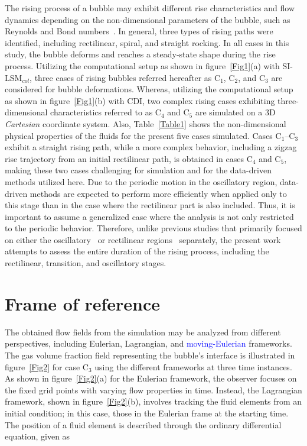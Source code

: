 \documentclass[a4paper,fleqn]{cas-sc}
\newcommand{\hl}[1]{\textcolor{blue}{#1}}
\newcommand{\hl}[1]{#1}
\begin{document}
	The rising process of a bubble may exhibit different rise characteristics and flow dynamics depending on the non-dimensional parameters of the bubble, such as Reynolds and Bond numbers~\cite{Cano-Lozano2016, Hua2007}. In general, three types of rising paths were identified, including rectilinear, spiral, and straight rocking. In all cases in this study, the bubble deforms and reaches a steady-state shape during the rise process. Utilizing the computational setup as shown in figure~\ref{Fig1}(a) with SI-LSM$_{col}$, three cases of rising bubbles referred hereafter as C$_1$, C$_2$, and C$_3$ are considered for bubble deformations. Whereas, utilizing the computational setup as shown in figure~\ref{Fig1}(b) with CDI, two complex rising cases exhibiting three-dimensional characteristics referred to as C$_4$ and C$_5$ are simulated on a 3D \textit{Cartesian} coordinate system. Also, Table~\ref{Table1} shows the non-dimensional physical properties of the fluids for the present five cases simulated. Cases C$_1$--C$_3$ exhibit a straight rising path, while a more complex behavior, including a zigzag rise trajectory from an initial rectilinear path, is obtained in cases C$_4$ and C$_5$, making these two cases challenging for simulation and for the data-driven methods utilized here. Due to the periodic motion in the oscillatory region, data-driven methods are expected to perform more efficiently when applied only to this stage than in the case where the rectilinear part is also included. Thus, it is important to assume a generalized case where the analysis is not only restricted to the periodic behavior. Therefore, unlike previous studies that primarily focused on either the oscillatory~\cite{Yin2023} or rectilinear regions~\cite{Yin2023a} separately, the present work attempts to assess the entire duration of the rising process, including the rectilinear, transition, and oscillatory stages. 
	
	\section{Frame of reference}
	\label{Framework}
	The obtained flow fields from the simulation may be analyzed from different perspectives, including Eulerian, Lagrangian, and \hl{moving-Eulerian} frameworks. The gas volume fraction field representing the bubble's interface is illustrated in figure~\ref{Fig2} for case C$_3$ using the different frameworks at three time instances. As shown in figure~\ref{Fig2}(a) for the Eulerian framework, the observer focuses on the fixed grid points with varying flow properties in time. Instead, the Lagrangian framework, shown in figure~\ref{Fig2}(b), involves tracking the fluid elements from an initial condition; in this case, those in the Eulerian frame at the starting time. The position of a fluid element is described through the ordinary differential equation, given as
	
\end{document}
